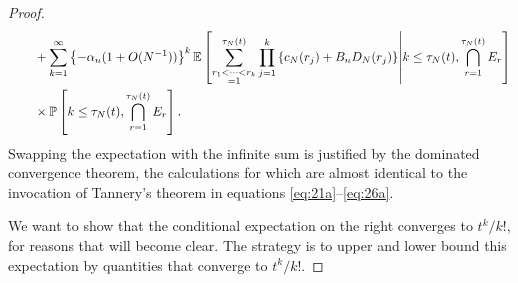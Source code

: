 \documentclass{article}
\newcommand{\Prob}{\mathbb{P}}
\newcommand{\E}{\mathbb{E}}
\newcommand{\1}[1]{\mathbbm{1}_{#1}}
\begin{document}
\begin{proof}
\begin{align}
&\qquad + \sum_{k=1}^{\infty} \left\{- \alpha_n (1+O(N^{-1}))\right\}^k
\E \left[ \sum_{\substack{r_1<\dots<r_k \\ =1}}^{\tau_N(t)}\prod_{j=1}^k 
\left\{ c_N(r_j) + B_n D_N(r_j) \right\} \middle| k\leq\tau_N(t), \bigcap_{r=1}^{\tau_N(t)} E_r \right] \notag\\
&\qquad \times \Prob \left[ k\leq \tau_N(t), \bigcap_{r=1}^{\tau_N(t)} E_r \right] .
\end{align}
Swapping the expectation with the infinite sum is justified by the dominated convergence theorem, the calculations for which are almost identical to the invocation of Tannery's theorem in equations 
\eqref{eq:21a}--\eqref{eq:26a}.

We want to show that the conditional expectation on the right converges to $t^k/k!$, for reasons that will become clear. The strategy is to upper and lower bound this expectation by quantities that converge to $t^k/k!$. 


\end{proof}
\end{document}

